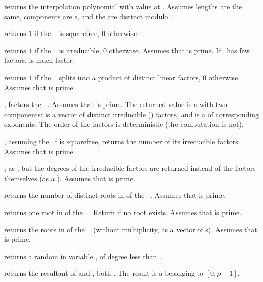  returns the 
interpolation polynomial with value  at . Assumes lengths
are the same, components are s, and the  are distinct
modulo .

 returns $1$ if the
~ is squarefree, $0$ otherwise.

 returns $1$ if the ~
is irreducible, $0$ otherwise. Assumes that  is prime. If~ has
few factors,  is much faster.

 returns $1$ if the
~ splits into a product of distinct linear factors, $0$
otherwise. Assumes that  is prime.

, factors the ~. Assumes
that  is prime. The returned value  is a  with two
components:  is a vector of distinct irreducible ()
factors, and  is a  of corresponding exponents. The
order of the factors is deterministic (the computation is not).

, assuming the ~f is squarefree,
returns the number of its irreducible factors. Assumes that  is prime.

, as , but the
degrees of the irreducible factors are returned instead of the factors
themselves (as a ). Assumes that  is prime.

 returns the number of distinct
roots in  of the ~. Assumes that  is prime.

 returns one root in  of
the ~. Return  if no root exists.
Assumes that  is prime.

 returns the roots in  of
the ~ (without multiplicity, as a vector of s).
Assumes that  is prime.

 returns a random 
in variable , of degree less than~.

 returns the resultant
of  and , both . The result is a 
belonging to $[0,p-1]$.

